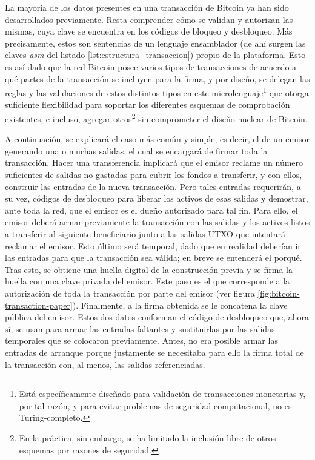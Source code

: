 La mayoría de los datos presentes en una transacción de Bitcoin ya han sido desarrollados previamente. Resta comprender cómo se validan y autorizan las mismas, cuya clave se encuentra en los códigos de bloqueo y desbloqueo. Más precisamente, estos son sentencias de un lenguaje ensamblador (de ahí surgen las claves \textit{asm} del listado \ref{lst:estructura_transaccion}) propio de la plataforma. Esto es así dado que la red Bitcoin posee varios tipos de transacciones de acuerdo a qué partes de la transacción se incluyen para la firma, y por diseño, se delegan las reglas y las validaciones de estos distintos tipos en este microlenguaje\footnote{Está específicamente diseñado para validación de transacciones monetarias y, por tal razón, y para evitar problemas de seguridad computacional, no es Turing-completo.} que otorga suficiente flexibilidad para soportar los diferentes esquemas de comprobación existentes, e incluso, agregar otros\footnote{En la práctica, sin embargo, se ha limitado la inclusión libre de otros esquemas por razones de seguridad.} sin comprometer el diseño nuclear de Bitcoin.

A continuación, se explicará el caso más común y simple, es decir, el de un emisor generando una o muchas salidas, el cual se encargará de firmar toda la transacción. Hacer una transferencia implicará que el emisor reclame un número suficientes de salidas no gastadas para cubrir los fondos a transferir, y con ellos, construir las entradas de la nueva transacción. Pero tales entradas requerirán, a su vez, códigos de desbloqueo para liberar los activos de esas salidas y demostrar, ante toda la red, que el emisor es el dueño autorizado para tal fin. Para ello, el emisor deberá armar previamente la transacción con las salidas y los activos listos a transferir al siguiente beneficiario junto a las salidas UTXO que intentará reclamar el emisor. Esto último será temporal, dado que en realidad deberían ir las entradas para que la transacción sea válida; en breve se entenderá el porqué. Tras esto, se obtiene una huella digital de la construcción previa y se firma la huella con una clave privada del emisor. Este paso es el que corresponde a la autorización de toda la transacción por parte del emisor (ver figura \ref{fig:bitcoin-transaction-paper}). Finalmente, a la firma obtenida se le concatena la clave pública del emisor. Estos dos datos conforman el código de desbloqueo que, ahora sí, se usan para armar las entradas faltantes y sustituirlas por las salidas temporales que se colocaron previamente. Antes, no era posible armar las entradas de arranque porque justamente se necesitaba para ello la firma total de la transacción con, al menos, las salidas referenciadas.

